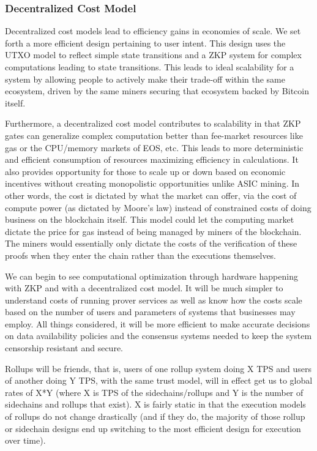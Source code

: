 \documentclass[peerreview]{ieeesyscoin}
\begin{document}
\subsubsection{Decentralized Cost Model}

Decentralized cost models lead to efficiency gains in economies of scale. We set forth a more efficient design pertaining to user intent. This design uses the UTXO model to reflect simple state transitions and a ZKP system for complex computations leading to state transitions. This leads to ideal scalability for a system by allowing people to actively make their trade-off within the same ecosystem, driven by the same miners securing that ecosystem backed by Bitcoin itself.

Furthermore, a decentralized cost model contributes to scalability in that ZKP gates can generalize complex computation better than fee-market resources like gas or the CPU/memory markets of EOS, etc. This leads to more deterministic and efficient consumption of resources maximizing efficiency in calculations. It also provides opportunity for those to scale up or down based on economic incentives without creating monopolistic opportunities unlike ASIC mining. In other words, the cost is dictated by what the market can offer, via the cost of compute power (as dictated by Moore's law) instead of constrained costs of doing business on the blockchain itself. This model could let the computing market dictate the price for gas instead of being managed by miners of the blockchain. The miners would essentially only dictate the costs of the verification of these proofs when they enter the chain rather than the executions themselves.

We can begin to see computational optimization through hardware happening with ZKP and with a decentralized cost model. It will be much simpler to understand costs of running prover services as well as know how the costs scale based on the number of users and parameters of systems that businesses may employ. All things considered, it will be more efficient to make accurate decisions on data availability policies and the consensus systems needed to keep the system censorship resistant and secure.

Rollups will be friends, that is, users of one rollup system doing X TPS and users of another doing Y TPS, with the same trust model, will in effect get us to global rates of X*Y (where X is TPS of the sidechains/rollups and Y is the number of sidechains and rollups that exist). X is fairly static in that the execution models of rollups do not change drastically (and if they do, the majority of those rollup or sidechain designs end up switching to the most efficient design for execution over time).
\end{document}
